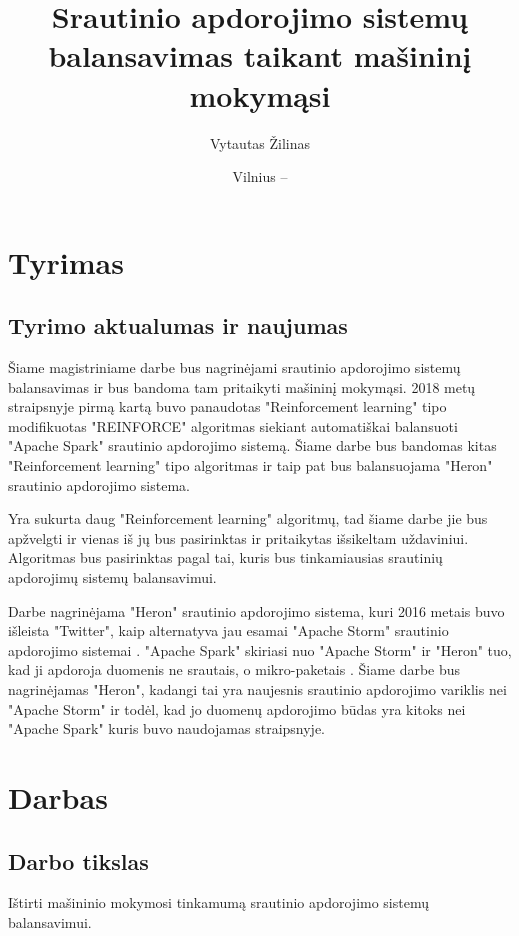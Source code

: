 \documentclass{VUMIFPSbakalaurinis}
\title{Srautinio apdorojimo sistemų balansavimas taikant mašininį mokymąsi}
\author{Vytautas Žilinas}
\date{Vilnius – \the\year}
\begin{document}
 
\maketitle

\cleardoublepage{}
\setcounter{page}{2}

\section{Tyrimas}
\subsection{Tyrimo aktualumas ir naujumas}

Šiame magistriniame darbe bus nagrinėjami srautinio apdorojimo sistemų balansavimas ir bus bandoma tam pritaikyti mašininį mokymąsi. 
2018 metų straipsnyje \cite{vaquero2018autotuning} pirmą kartą buvo panaudotas "Reinforcement learning" tipo modifikuotas "REINFORCE" algoritmas \cite{PolicyGradient} siekiant automatiškai balansuoti "Apache Spark" srautinio apdorojimo sistemą. Šiame darbe bus bandomas kitas "Reinforcement learning" tipo algoritmas ir taip pat bus balansuojama "Heron" srautinio apdorojimo sistema.

Yra sukurta daug "Reinforcement learning" algoritmų, tad šiame darbe jie bus apžvelgti ir vienas iš jų bus pasirinktas ir pritaikytas išsikeltam uždaviniui. Algoritmas bus pasirinktas pagal tai, kuris bus tinkamiausias srautinių apdorojimų sistemų balansavimui.

Darbe nagrinėjama "Heron" srautinio apdorojimo sistema, kuri 2016 metais buvo išleista "Twitter", kaip alternatyva jau esamai "Apache Storm" srautinio apdorojimo sistemai \cite{openSourcing}. "Apache Spark" skiriasi nuo "Apache Storm" ir "Heron" tuo, kad ji apdoroja duomenis ne srautais, o mikro-paketais \cite{karau2015learning}. Šiame darbe bus nagrinėjamas "Heron", kadangi tai yra naujesnis srautinio apdorojimo variklis nei "Apache Storm" ir todėl, kad jo duomenų apdorojimo būdas yra kitoks nei "Apache Spark" kuris buvo naudojamas \cite{vaquero2018autotuning} straipsnyje.

\section{Darbas}

\subsection{Darbo tikslas}
Ištirti mašininio mokymosi tinkamumą srautinio apdorojimo sistemų balansavimui. 
\end{document}
